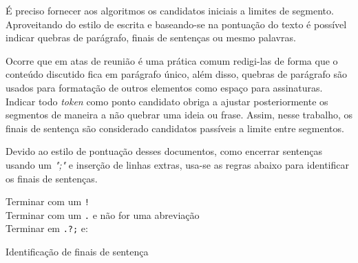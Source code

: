 	É preciso fornecer aos algoritmos os candidatos iniciais a limites de segmento. Aproveitando do estilo de escrita e baseando-se na pontuação do texto é possível indicar quebras de parágrafo, finais de sentenças ou mesmo palavras. 

	Ocorre que em atas de reunião é uma prática comum redigi-las de forma que o conteúdo discutido fica em parágrafo único, além disso, quebras de parágrafo são usados para formatação de outros elementos como espaço para assinaturas. Indicar todo \textit{token} como ponto candidato obriga a ajustar posteriormente os segmentos de maneira a não quebrar uma ideia ou frase. Assim, nesse trabalho, os finais de sentença são considerado candidatos passíveis a limite entre segmentos. 
	
	Devido ao estilo de pontuação desses documentos, como encerrar sentenças usando um \textit{";"} e inserção de linhas extras, usa-se as regras abaixo para identificar os finais de sentenças.  


\begin{algorithm}

	
	
	 {	

	Terminar com um \texttt{!}\\
	Terminar com um \texttt{.} e não for uma abreviação\\
	Terminar em \texttt{.?;} e:
	}
	
	\caption{Identificação de finais de sentença}
\end{algorithm}

















